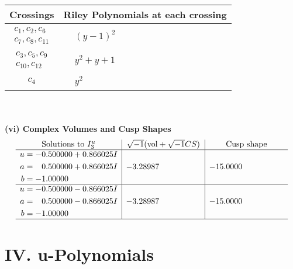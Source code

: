 \documentclass[1p]{elsarticle_modified}
\theoremstyle{definition}
\newcommand{\I}{\sqrt{-1}}
\begin{document}
\begin{tabular}{m{50pt}|m{274pt}}
Crossings & \hspace{64pt}Riley Polynomials at each crossing \\
\hline $$\begin{aligned}c_{1},c_{2},c_{6}\\c_{7},c_{8},c_{11}\end{aligned}$$&$\begin{aligned}
&(y-1)^2
\end{aligned}$\\
\hline $$\begin{aligned}c_{3},c_{5},c_{9}\\c_{10},c_{12}\end{aligned}$$&$\begin{aligned}
&y^2+y+1
\end{aligned}$\\
\hline $$\begin{aligned}c_{4}\end{aligned}$$&$\begin{aligned}
&y^2
\end{aligned}$\\
\hline
\end{tabular}\\~\\
\newpage\flushleft \textbf{(vi) Complex Volumes and Cusp Shapes}
$$\begin{array}{c|c|c}  
\text{Solutions to }I^u_{3}& \I (\text{vol} + \sqrt{-1}CS) & \text{Cusp shape}\\
 \hline 
\begin{aligned}
u &= -0.500000 + 0.866025 I \\
a &= \phantom{-}0.500000 + 0.866025 I \\
b &= -1.00000\phantom{ +0.000000I}\end{aligned}
 & -3.28987\phantom{ +0.000000I} & -15.0000\phantom{ +0.000000I} \\ \hline\begin{aligned}
u &= -0.500000 - 0.866025 I \\
a &= \phantom{-}0.500000 - 0.866025 I \\
b &= -1.00000\phantom{ +0.000000I}\end{aligned}
 & -3.28987\phantom{ +0.000000I} & -15.0000\phantom{ +0.000000I}\\
 \hline 
 \end{array}$$\newpage
\newpage\renewcommand{\arraystretch}{1}
\centering \section*{ IV. u-Polynomials}
\end{document}
